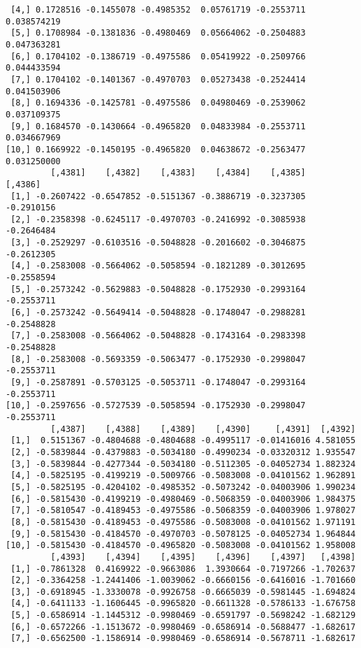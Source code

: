 \documentclass[
  letterpaper,
  DIV=11,
  numbers=noendperiod]{scrreprt}
\begin{document}
\begin{verbatim}
 [4,] 0.1728516 -0.1455078 -0.4985352  0.05761719 -0.2553711  0.038574219
 [5,] 0.1708984 -0.1381836 -0.4980469  0.05664062 -0.2504883  0.047363281
 [6,] 0.1704102 -0.1386719 -0.4975586  0.05419922 -0.2509766  0.044433594
 [7,] 0.1704102 -0.1401367 -0.4970703  0.05273438 -0.2524414  0.041503906
 [8,] 0.1694336 -0.1425781 -0.4975586  0.04980469 -0.2539062  0.037109375
 [9,] 0.1684570 -0.1430664 -0.4965820  0.04833984 -0.2553711  0.034667969
[10,] 0.1669922 -0.1450195 -0.4965820  0.04638672 -0.2563477  0.031250000
         [,4381]    [,4382]    [,4383]    [,4384]    [,4385]    [,4386]
 [1,] -0.2607422 -0.6547852 -0.5151367 -0.3886719 -0.3237305 -0.2910156
 [2,] -0.2358398 -0.6245117 -0.4970703 -0.2416992 -0.3085938 -0.2646484
 [3,] -0.2529297 -0.6103516 -0.5048828 -0.2016602 -0.3046875 -0.2612305
 [4,] -0.2583008 -0.5664062 -0.5058594 -0.1821289 -0.3012695 -0.2558594
 [5,] -0.2573242 -0.5629883 -0.5048828 -0.1752930 -0.2993164 -0.2553711
 [6,] -0.2573242 -0.5649414 -0.5048828 -0.1748047 -0.2988281 -0.2548828
 [7,] -0.2583008 -0.5664062 -0.5048828 -0.1743164 -0.2983398 -0.2548828
 [8,] -0.2583008 -0.5693359 -0.5063477 -0.1752930 -0.2998047 -0.2553711
 [9,] -0.2587891 -0.5703125 -0.5053711 -0.1748047 -0.2993164 -0.2553711
[10,] -0.2597656 -0.5727539 -0.5058594 -0.1752930 -0.2998047 -0.2553711
         [,4387]    [,4388]    [,4389]    [,4390]     [,4391]  [,4392]
 [1,]  0.5151367 -0.4804688 -0.4804688 -0.4995117 -0.01416016 4.581055
 [2,] -0.5839844 -0.4379883 -0.5034180 -0.4990234 -0.03320312 1.935547
 [3,] -0.5839844 -0.4277344 -0.5034180 -0.5112305 -0.04052734 1.882324
 [4,] -0.5825195 -0.4199219 -0.5009766 -0.5083008 -0.04101562 1.962891
 [5,] -0.5825195 -0.4204102 -0.4985352 -0.5073242 -0.04003906 1.990234
 [6,] -0.5815430 -0.4199219 -0.4980469 -0.5068359 -0.04003906 1.984375
 [7,] -0.5810547 -0.4189453 -0.4975586 -0.5068359 -0.04003906 1.978027
 [8,] -0.5815430 -0.4189453 -0.4975586 -0.5083008 -0.04101562 1.971191
 [9,] -0.5815430 -0.4184570 -0.4970703 -0.5078125 -0.04052734 1.964844
[10,] -0.5815430 -0.4184570 -0.4965820 -0.5083008 -0.04101562 1.958008
         [,4393]    [,4394]    [,4395]    [,4396]    [,4397]   [,4398]
 [1,] -0.7861328  0.4169922 -0.9663086  1.3930664 -0.7197266 -1.702637
 [2,] -0.3364258 -1.2441406 -1.0039062 -0.6660156 -0.6416016 -1.701660
 [3,] -0.6918945 -1.3330078 -0.9926758 -0.6665039 -0.5981445 -1.694824
 [4,] -0.6411133 -1.1606445 -0.9965820 -0.6611328 -0.5786133 -1.676758
 [5,] -0.6586914 -1.1445312 -0.9980469 -0.6591797 -0.5698242 -1.682129
 [6,] -0.6572266 -1.1513672 -0.9980469 -0.6586914 -0.5688477 -1.682617
 [7,] -0.6562500 -1.1586914 -0.9980469 -0.6586914 -0.5678711 -1.682617

\end{verbatim}
\end{document}
